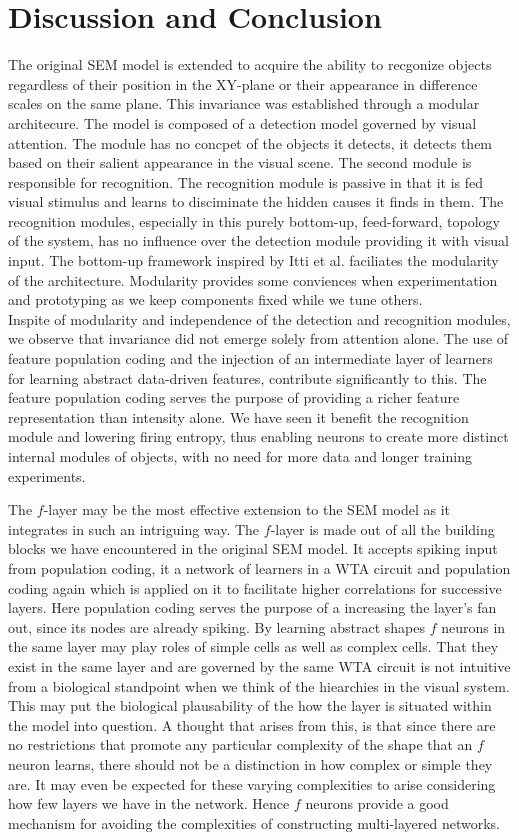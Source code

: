 \documentclass{report}
\begin{document}
\chapter{Discussion and Conclusion}

The original SEM model is extended to acquire the ability to recgonize objects regardless of their position in the XY-plane or their appearance in difference scales on the same plane. This invariance was established through a modular architecure. The model is composed of a detection model governed by visual attention. The module has no concpet of the objects it detects, it detects them based on their salient appearance in the visual scene. The second module is responsible for recognition. The recognition module is passive in that it is fed visual stimulus and learns to disciminate the hidden causes it finds in them. The recognition modules, especially in this purely bottom-up, feed-forward, topology of the system, has no influence over the detection module providing it with visual input. The bottom-up framework inspired by Itti et al. faciliates the modularity of the architecture. Modularity provides some conviences when experimentation and prototyping as we keep components fixed while we tune others.\\
Inspite of modularity and independence of the detection and recognition modules, we observe that invariance did not emerge solely from attention alone. The use of feature population coding and the injection of an intermediate layer of learners for learning abstract data-driven features, contribute significantly to this. The feature population coding serves the purpose of providing a richer feature representation than intensity alone. We have seen it benefit the recognition module and lowering firing entropy, thus enabling neurons to create more distinct internal modules of objects, with no need for more data and longer training experiments.

The $f$-layer may be the most effective extension to the SEM model as it integrates in such an intriguing way. The $f$-layer is made out of all the building blocks we have encountered in the original SEM model. It accepts spiking input from population coding, it a network of learners in a WTA circuit and population coding again which is applied on it to facilitate higher correlations for successive layers. Here population coding serves the purpose of a increasing the layer's fan out, since its nodes are already spiking. By learning abstract shapes $f$ neurons in the same layer may play roles of simple cells as well as complex cells. That they exist in the same layer and are governed by the same WTA circuit is not intuitive from a biological standpoint when we think of the hiearchies in the visual system. This may put the biological plausability of the how the layer is situated within the model into question. A thought that arises from this, is that since there are no restrictions that promote any particular complexity of the shape that an $f$ neuron learns, there should not be a distinction in how complex or simple they are. It may even be expected for these varying complexities to arise considering how few layers we have in the network. Hence $f$ neurons provide a good mechanism for avoiding the complexities of constructing multi-layered networks.
\end{document}
